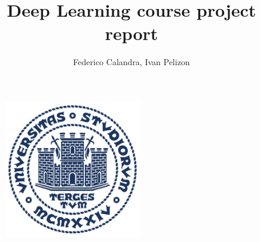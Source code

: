 \documentclass[a4paper,11pt,openany]{article}
\begin{document}
    \title{\huge{Deep Learning course project report}}
    \author{Federico Calandra, Ivan Pelizon}
    \begin{figure}[h]
        \centering
        \includegraphics[width=6cm,height=6cm]{img/units_sigillo_pantone-534}
    \end{figure}
    \pagebreak

    {\hypersetup{linkcolor=black}
        \tableofcontents
    }
    \newpage

    

    \newpage
    
    
\end{document}
